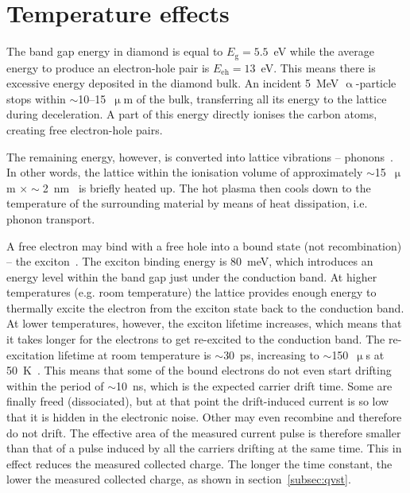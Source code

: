 \section{Temperature effects}
The band gap energy in diamond is equal to $E_\mathrm{g}=5.5$~eV while the average energy to produce an electron-hole pair is $E_{\mathrm{eh}}=13$~eV. This means there is excessive energy deposited in the diamond bulk. An incident 5~MeV $\upalpha$-particle stops within $\sim$10--15~$\upmu$m of the bulk, transferring all its energy to the lattice during deceleration. A part of this energy directly ionises the carbon atoms, creating free electron-hole pairs. 

The remaining energy, however, is converted into lattice vibrations -- phonons~\cite{PhysRevLett.13.13, Jansen:1956431}. In other words, the lattice within the ionisation volume  of approximately $\sim$15~$\upmu$m $\times\sim$2~nm~\cite{Jansen:1956431} is briefly heated up. The hot plasma then cools down to the temperature of the surrounding material by means of heat dissipation, i.e. phonon transport.

A free electron may bind with a free hole into a bound state (not recombination) -- the exciton~\cite{1970PhyEd...5..226L}. The exciton binding energy is 80~meV, which introduces an energy level within the band gap just under the conduction band. At higher temperatures (e.g. room temperature) the lattice provides enough energy to thermally excite the electron from the exciton state back to the conduction band. At lower temperatures, however, the exciton lifetime increases, which means that it takes longer for the electrons to get re-excited to the conduction band. The re-excitation lifetime at room temperature is $\sim$30~ps, increasing to $\sim$150~$\upmu$s at 50~K~\cite{Jansen:1956431}. This means that some of the bound electrons do not even start drifting within the period of $\sim$10~ns, which is the expected carrier drift time.
Some are finally freed (dissociated), but at that point the drift-induced current is so low that it is hidden in the electronic noise. Other may even recombine and therefore do not drift. The effective area of the measured current pulse is therefore smaller than that of a pulse induced by all the carriers drifting at the same time. This in effect reduces the measured collected charge. The longer the time constant, the lower the measured collected charge, as shown in section~\ref{subsec:qvst}.

